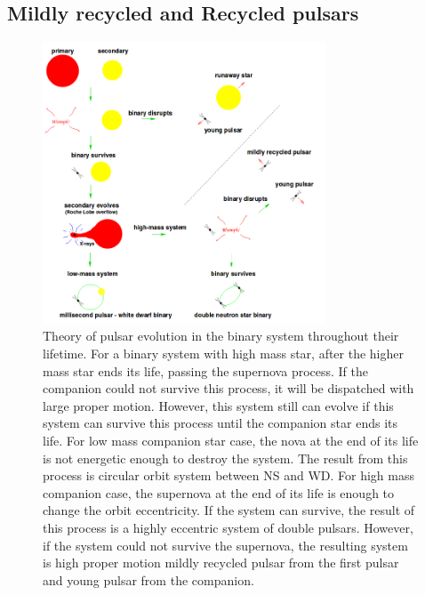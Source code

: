 \documentclass[thesis_msc.tex]{subfiles}
\begin{document}
\subsection{Mildly recycled and Recycled pulsars}

\begin{figure}[h] \centering \includegraphics[width=0.75\textwidth]{figures/evo.png}
\caption{Theory of pulsar evolution in the binary system throughout their lifetime. For a binary system with high mass star, after the higher mass star ends its life, passing the supernova process. If the companion could not survive this process, it will be dispatched with large proper motion. However, this system still can evolve if this system can survive this process until the companion star ends its life. For low mass companion star case, the nova at the end of its life is not energetic enough to destroy the system. The result from this process is circular orbit system between NS and WD. For high mass companion case, the supernova at the end of its life is enough to change the orbit eccentricity. If the system can survive, the result of this process is a highly eccentric system of double pulsars. However, if the system could not survive the supernova, the resulting system is high proper motion mildly recycled pulsar from the first pulsar and young pulsar from the companion.   }

\label{evo}
\end{figure}
\end{document}
